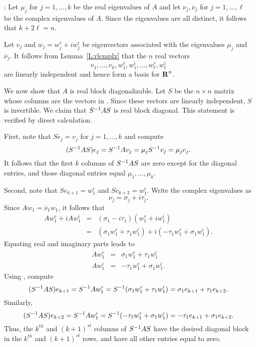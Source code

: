:   Let $\mu_j$ for 
$j=1,\ldots,k$ be the real eigenvalues of $A$ and let 
$\nu_j,\overline{\nu}_j$ for $j=1,\ldots,\ell$ be the complex eigenvalues of 
$A$. Since the eigenvalues are all distinct, it follows that $k+2\ell=n$.

Let $v_j$ and $w_j=w_j^r+iw_j^i$ be eigenvectors associated with the 
eigenvalues $\mu_j$ and $\overline{\nu}_j$.  It follows from 
Lemma~\ref{L:rlcmplx} that the $n$ real vectors
\begin{equation}  \label{e:complexeigen}
v_1,\ldots,v_k,w_1^r,w_1^i,\ldots,w_\ell^r,w_\ell^i
\end{equation}
are linearly independent and hence form a basis for $\mbox{$\bf{R}$}^n$.

We now show that $A$ is real block diagonalizable.  Let $S$ be the $n\times
n$ matrix whose columns are the vectors in .  Since
these vectors are linearly independent, $S$ is invertible.  We claim that 
$S^{-1} AS$ is real block diagonal.  This statement is verified by direct
calculation.

First, note that $Se_j=v_j$ for $j=1,\ldots,k$ and compute
\[
(S^{-1} AS)e_j = S^{-1} Av_j = \mu_j S^{-1} v_j = \mu_j e_j.
\]
It follows that the first $k$ columns of $S^{-1} AS$ are zero except for the 
diagonal entries, and those diagonal entries equal $\mu_1,\ldots,\mu_k$.

Second, note that $Se_{k+1}=w_1^r$ and $Se_{k+2}=w_1^i$.  Write the complex 
eigenvalues as
\[
\nu_j = \sigma_j+i\tau_j.
\]
Since 
$Aw_1 = \overline{\nu}_1w_1$, it follows that
\begin{eqnarray*}
Aw_1^r+iAw_1^i & = & (\sigma_1-i\tau_1)(w_1^r+iw_1^i)\\
& = & (\sigma_1w_1^r+\tau_1w_1^i) + i(-\tau_1w_1^r +\sigma_1w_1^i).
\end{eqnarray*}
Equating real and imaginary parts leads to 
\begin{equation}  \label{e:complexsimple}
\begin{array}{ccc} Aw_1^r & = & \sigma_1w_1^r+\tau_1w_1^i\\
Aw_1^i & = &   -\tau_1w_1^r+\sigma_1w_1^i. \end{array}
\end{equation}
Using , compute
\[
(S^{-1} AS)e_{k+1} = S^{-1} Aw_1^r = S^{-1}(\sigma_1w_1^r+\tau_1w_1^i) 
= \sigma_1e_{k+1} + \tau_1e_{k+2}.
\]
Similarly, 
\[
(S^{-1} AS)e_{k+2} = S^{-1} Aw_1^i = S^{-1}(-\tau_1w_1^r+\sigma_1w_1^i)
= -\tau_1e_{k+1} + \sigma_1e_{k+2}.
\]
Thus, the $k^{th}$ and $(k+1)^{st}$ columns of $S^{-1} AS$ have the desired
diagonal block in the $k^{th}$ and $(k+1)^{st}$ rows, and have all other 
entries equal to zero.

